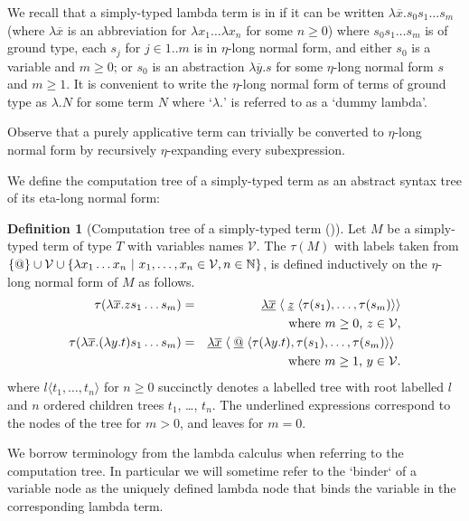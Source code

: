 \documentclass[a4paper]{article}[12pt]
\theoremstyle{remark}
\theoremstyle{definition}
\newtheorem{definition}{Definition}[section]
\begin{document}
We recall that a simply-typed lambda term is in  if it can be written $\lambda \overline{x} . s_0 s_1 \ldots s_m$ (where $\lambda \overline{x}$ is an abbreviation for $\lambda x_1 \ldots \lambda x_n$ for some $n\geq 0$) where $s_0 s_1 \ldots s_m$ is of ground type, each $s_j$ for $j\in 1..m$ is in $\eta$-long normal form, and either $s_0$ is a variable and $m\geq0$; or $s_0$ is an abstraction $\lambda\overline{y}.s$ for some $\eta$-long normal form $s$ and $m\geq1$.
It is convenient to write the $\eta$-long normal form of terms of ground type as $\lambda . N$ for some term $N$ where `$\lambda.$' is referred to as a `dummy lambda'.

Observe that a purely applicative term can trivially be converted to $\eta$-long normal form by recursively $\eta$-expanding every subexpression.

We define the computation tree of a simply-typed term as an abstract syntax tree of its eta-long normal form:
\begin{definition}[Computation tree of a simply-typed term (\cite{BlumPhd})]
	Let $M$ be a simply-typed term of type $T$ with variables names $\mathcal{V}$.
	The  $\tau(M)$ with labels taken from $ \{ @ \} \cup \mathcal{V} \cup \{ \lambda x_1 \ldots x_n \ | \ x_1 ,\ldots, x_n \in
	\mathcal{V}, n\in\mathbb{N} \}$, is defined inductively on the $\eta$-long normal form of $M$ as follows.
	\begin{eqnarray*}
		\tau(\lambda \overline{x} . z s_1 \ldots s_m) &=& \underline{\lambda \overline{x}}\; \langle\; \underline z\; \langle\tau(s_1),\ldots,\tau(s_m)\rangle\rangle\\
		&& \hbox {where $m\geq 0$, $z \in \mathcal{V}$}, \\
 \tau(\lambda \overline{x} . (\lambda y.t) s_1 \ldots s_m) &=& \underline{\lambda \overline{x}}\; \langle\; \underline @ \; \langle \tau(\lambda y.t),\tau(s_1),\ldots,\tau(s_m) \rangle \rangle \enspace\\
&&  \hbox{where $m\geq 1$, $y\in \mathcal{V}$}.
	\end{eqnarray*}
	where $l\langle t_1, \ldots, t_n \rangle$ for $n \geq 0$ succinctly denotes a labelled tree with root labelled $l$ and $n$ ordered children trees $t_1$, \ldots, $t_n$. The underlined expressions correspond to the nodes of the tree for $m>0$, and leaves for $m=0$.
\end{definition}

We borrow terminology from the lambda calculus when referring to the computation tree. In particular we will sometime refer to the `binder` of a variable node as the uniquely defined lambda node that binds the variable in the corresponding lambda term.
\end{document}

